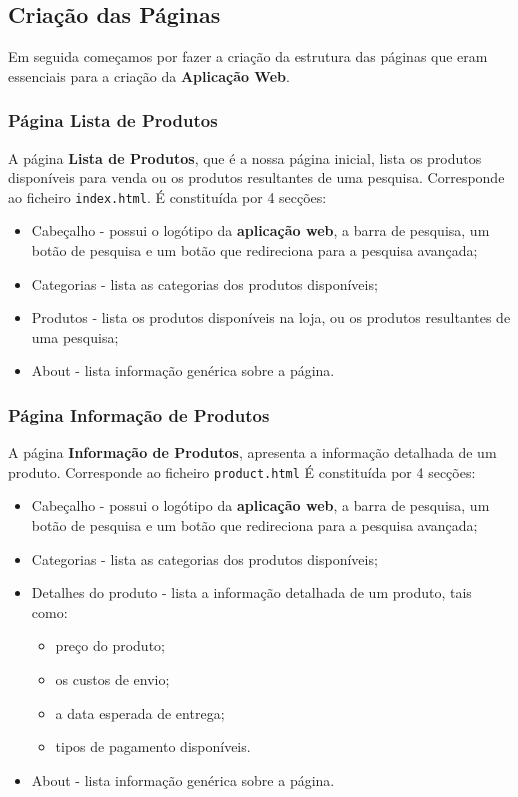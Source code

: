 \documentclass[11pt]{article}   %
\begin{document}
\subsection{Criação das Páginas}

Em seguida começamos por fazer a criação da estrutura das páginas que eram essenciais para a criação da \textbf{Aplicação Web}.

\subsubsection{Página Lista de Produtos}

A página \textbf{Lista de Produtos}, que é a nossa página inicial, lista os produtos disponíveis para venda ou os produtos
resultantes de uma pesquisa. Corresponde ao ficheiro \verb|index.html|.
É constituída por 4 secções:
\begin{itemize}
    \item Cabeçalho - possui o logótipo da \textbf{aplicação web}, a barra de pesquisa, um botão de pesquisa e um botão que redireciona para a pesquisa avançada;
    \item Categorias - lista as categorias dos produtos disponíveis;
    \item Produtos - lista os produtos disponíveis na loja, ou os produtos resultantes de uma pesquisa;
    \item About - lista informação genérica sobre a página.
\end{itemize}

\subsubsection{Página Informação de Produtos}

A página \textbf{Informação de Produtos}, apresenta a informação detalhada de um produto.
Corresponde ao ficheiro \verb|product.html|
É constituída por 4 secções:
\begin{itemize}
    \item Cabeçalho - possui o logótipo da \textbf{aplicação web}, a barra de pesquisa, um botão de pesquisa e um botão que redireciona para a pesquisa avançada;
    \item Categorias - lista as categorias dos produtos disponíveis;
    \item Detalhes do produto - lista a informação detalhada de um produto, tais como:
        \begin{itemize}
            \item preço do produto;
            \item os custos de envio;
            \item a data esperada de entrega; 
            \item tipos de pagamento disponíveis.
        \end{itemize}
    \item About - lista informação genérica sobre a página.
\end{itemize}
\end{document}
